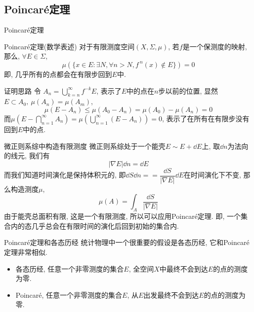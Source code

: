 \documentclass[aspectratio=169]{wzbeamer}
\begin{document}
    \subsection{Poincar\'e定理}
    \begin{frame}{Poincar\'e定理}
        \begin{alertblock}{Poincar\'e定理(数学表述)}
            对于有限测度空间$(X,\Sigma,\mu)$, 若$f$是一个保测度的映射, 那么, $\forall E\in\Sigma$, 
            \begin{equation}
                \mu(\{x\in E: \exists N, \forall n > N, f^{\ n}(x) \notin E \}) = 0
            \end{equation} 
            即, 几乎所有的点都会在有限步回到$E$中.
        \end{alertblock}
    \end{frame}
    \begin{frame}{证明思路}
        令 $A_n = \bigcup_{k=n}^{\infty} f^{-k}E$, 表示了$E$中的点在$n$步以前的位置, 显然$E\subset A_0,\ \mu(A_n) = \mu(A_m)$, 
        \begin{equation}
            \mu(E - A_n) \leqslant \mu(A_0 - A_n) = \mu(A_0) - \mu(A_n) = 0
        \end{equation}
        而$\mu(E - \bigcap_{n=1}^\infty A_n) = \mu(\bigcup_{n=1}^\infty (E - A_n)) = 0 $, 表示了在所有在有限步没有回到$E$中的点.
    \end{frame}
    \begin{frame}{微正则系综中构造有限测度}
        微正则系综处于一个能壳$E\sim E+\dd E$上, 取$\dd n$为法向的线元, 我们有
        \begin{equation}
            |\nabla E|\dd n = \dd E  
        \end{equation}
        而我们知道时间演化是保持体积元的, 即$\dd S\dd n == \dfrac{\dd S}{|\nabla E|} \dd E$在时间演化下不变, 那么构造测度$\mu$,
        \begin{equation}
            \mu(A) = \int_A \frac{\dd S}{|\nabla E|}
        \end{equation}
        由于能壳总面积有限, 这是一个有限测度, 所以可以应用Poincar\'e定理. 即, 一个集合内的态几乎总会在有限时间的演化后回到初始的集合内.
    \end{frame}
    \begin{frame}{Poincar\'e定理和各态历经}
        统计物理中一个很重要的假设是各态历经, 它和Poincar\'e定理非常相似.
        \begin{itemize}
            \item 各态历经, 任意一个非零测度的集合$E$, 全空间$X$中最终不会到达$E$的点的测度为零.
            \item Poincar\'e, 任意一个非零测度的集合$E$, 从$E$出发最终不会到达$E$的点的测度为零.
        \end{itemize}
    \end{frame}
    
\end{document}
